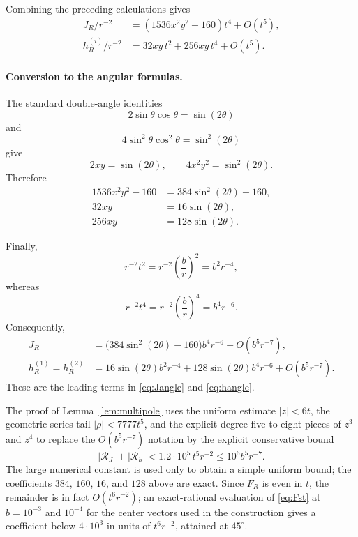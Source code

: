 \documentclass[12pt,a4paper]{article}
\newcommand{\abs}[1]{\lvert #1\rvert}
\begin{document}
Combining the preceding calculations gives
\begin{align}
J_R/r^{-2}
&=
\left(1536x^2y^2-160\right)t^4
+O(t^5),
\label{eq:app-Jt}\\
h_R^{(i)}/r^{-2}
&=
32xy\,t^2
+
256xy\,t^4
+O(t^5).
\label{eq:app-ht}
\end{align}

\paragraph{Conversion to the angular formulas.}

The standard double-angle identities
\[
2\sin\theta\cos\theta=\sin(2\theta)
\]
and
\[
4\sin^2\theta\cos^2\theta=\sin^2(2\theta)
\]
give
\[
2xy=\sin(2\theta),
\qquad
4x^2y^2=\sin^2(2\theta).
\]
Therefore
\begin{align}
1536x^2y^2-160
&=
384\sin^2(2\theta)-160,
\label{eq:app-Jtrig}\\
32xy
&=
16\sin(2\theta),
\label{eq:app-htrig2}\\
256xy
&=
128\sin(2\theta).
\label{eq:app-htrig4}
\end{align}

Finally,
\[
r^{-2}t^2
=
r^{-2}\left(\frac br\right)^2
=
b^2r^{-4},
\]
whereas
\[
r^{-2}t^4
=
r^{-2}\left(\frac br\right)^4
=
b^4r^{-6}.
\]
Consequently,
\begin{align}
J_R
&=
\bigl(384\sin^2(2\theta)-160\bigr)
b^4r^{-6}
+
O(b^5r^{-7}),
\label{eq:app-J-final}\\
h_R^{(1)}=h_R^{(2)}
&=
16\sin(2\theta)b^2r^{-4}
+
128\sin(2\theta)b^4r^{-6}
+
O(b^5r^{-7}).
\label{eq:app-h-final}
\end{align}
These are the leading terms in
\eqref{eq:Jangle} and \eqref{eq:hangle}.

The proof of Lemma~\ref{lem:multipole} uses the uniform estimate
$|z|<6t$, the geometric-series tail $\abs\rho<7777t^5$, and the explicit
degree-five-to-eight pieces of $z^3$ and $z^4$ to replace the
$O(b^5r^{-7})$ notation by the explicit conservative bound
\[
\abs{\mathcal R_J}+\abs{\mathcal R_h}
<1.2\cdot10^{5}\,t^5r^{-2}
\le
10^6 b^5r^{-7}.
\]
The large numerical constant is used only to obtain a simple uniform
bound; the coefficients $384$, $160$, $16$, and $128$ above are exact.
Since $F_R$ is even in $t$, the remainder is in fact $O(t^6r^{-2})$; an
exact-rational evaluation of \eqref{eq:Fst} at $b=10^{-3}$ and $10^{-4}$
for the center vectors used in the construction gives a coefficient below
$4\cdot10^{3}$ in units of $t^6r^{-2}$, attained at $45^\circ$.
\end{document}

